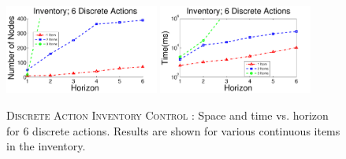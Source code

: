 \documentclass[twoside,11pt]{article}
\newcommand{\InventoryControl}{\textsc{Inventory Control }}
\begin{document}
\begin{figure}[tbp!]
\vspace{-2mm}
\centering
\includegraphics[width=0.45\textwidth]{pics/invD6Node.pdf}
\hspace{2mm}
\includegraphics[width=0.45\textwidth]{pics/invD6Time.pdf}
\vspace{-2mm}
\caption{%
\textsc{Discrete Action} \InventoryControl: Space and time vs. horizon for 6 discrete actions. Results are shown for various continuous items in the inventory.
}
\label{fig:invD6}
\vspace{-2mm}
\end{figure}
\end{document}
